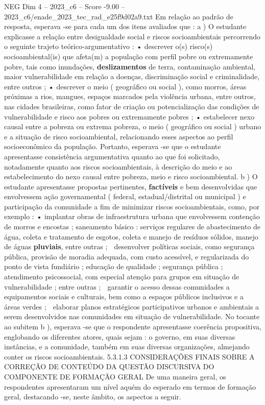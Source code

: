 \begin{textsample}{NEG Dim 4 – 2023\_c6 – Score -9.00 – 2023\_c6/enade\_2023\_tec\_rad\_e25f9d02a9.txt}
Em relação ao padrão de resposta, esperava -se para cada um dos itens avaliados que : a ) O estudante explicasse a relação entre desigualdade social e riscos socioambientais percorrendo o seguinte trajeto teórico-argumentativo : • descrever o(s) risco(s) socioambiental(is) que afeta(m) a população com perfil pobre ou extremamente pobre, tais como inundações, \textbf{deslizamentos} de terra, contaminação ambiental, maior vulnerabilidade em relação a doenças, discriminação social e criminalidade, entre outros ; • descrever o meio ( geográfico ou social ), como morros, áreas próximas a rios, mangues, espaços marcados pela violência urbana, entre outros, nas cidades brasileiras, como fator de criação ou potencialização das condições de vulnerabilidade e risco aos pobres ou extremamente pobres ; • estabelecer nexo causal entre a pobreza ou extrema pobreza, o meio ( geográfico ou social ) urbano e a situação de risco socioambiental, relacionando esses aspectos ao perfil socioeconômico da população.
Portanto, esperava -se que o estudante apresentasse consistência argumentativa quanto ao que foi solicitado, notadamente quanto aos riscos socioambientais, à descrição do meio e ao estabelecimento do nexo causal entre pobreza, meio e risco socioambiental. b ) O estudante apresentasse propostas pertinentes, \textbf{factíveis} e bem desenvolvidas que envolvessem ação governamental ( federal, estadual/distrital ou municipal ) e participação da comunidade a fim de minimizar riscos socioambientais, como, por exemplo : • implantar obras de infraestrutura urbana que envolvessem contenção de morros e encostas ; saneamento básico : serviços regulares de abastecimento de água, coleta e tratamento de esgotos, coleta e manejo de resíduos sólidos, manejo de águas \textbf{pluviais}, entre outras ;  desenvolver políticas sociais, como segurança pública, provisão de moradia adequada, com custo acessível, e regularizada do ponto de vista fundiário ; educação de qualidade ; segurança pública ; atendimento psicossocial, com especial atenção para grupos em situação de vulnerabilidade ; entre outras ;  garantir o acesso dessas comunidades a equipamentos sociais e culturais, bem como a espaços públicos inclusivos e a áreas verdes ;  elaborar planos estratégicos participativos urbanos e ambientais a serem desenvolvidos nas comunidades em situação de vulnerabilidade.
No tocante ao subitem b ), esperava -se que o respondente apresentasse coerência propositiva, englobando os diferentes atores, quais sejam : o governo, em suas diversas instâncias, e a comunidade, também em suas diversas organizações, almejando conter os riscos socioambientais. 5.3.1.3 CONSIDERAÇÕES FINAIS SOBRE A CORREÇÃO DE CONTEÚDO DA QUESTÃO DISCURSIVA DO COMPONENTE DE FORMAÇÃO GERAL De uma maneira geral, os respondentes apresentaram um nível aquém do esperado em termos de formação geral, destacando -se, neste âmbito, os aspectos a seguir.

\end{textsample}
